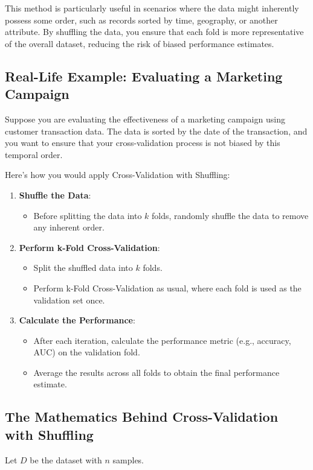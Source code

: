 \documentclass[10pt]{article}
\begin{document}
This method is particularly useful in scenarios where the data might inherently possess some order, such as records sorted by time, geography, or another attribute. By shuffling the data, you ensure that each fold is more representative of the overall dataset, reducing the risk of biased performance estimates.

\subsection{Real-Life Example: Evaluating a Marketing Campaign}
Suppose you are evaluating the effectiveness of a marketing campaign using customer transaction data. The data is sorted by the date of the transaction, and you want to ensure that your cross-validation process is not biased by this temporal order.

Here’s how you would apply Cross-Validation with Shuffling:

\begin{enumerate}
    \item \textbf{Shuffle the Data}:
    \begin{itemize}
        \item Before splitting the data into \(k\) folds, randomly shuffle the data to remove any inherent order.
    \end{itemize}
    \item \textbf{Perform k-Fold Cross-Validation}:
    \begin{itemize}
        \item Split the shuffled data into \(k\) folds.
        \item Perform k-Fold Cross-Validation as usual, where each fold is used as the validation set once.
    \end{itemize}
    \item \textbf{Calculate the Performance}:
    \begin{itemize}
        \item After each iteration, calculate the performance metric (e.g., accuracy, AUC) on the validation fold.
        \item Average the results across all folds to obtain the final performance estimate.
    \end{itemize}
\end{enumerate}

\subsection{The Mathematics Behind Cross-Validation with Shuffling}
Let \(D\) be the dataset with \(n\) samples.
\end{document}
